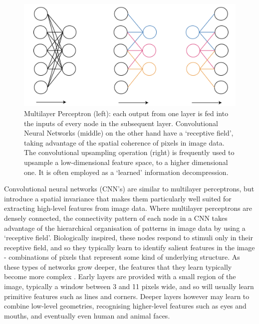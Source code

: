 \begin{figure}[tbp]
    \centering
    \includegraphics[width=5in]{images/cnnvsmlp.png}
    
    \caption{Multilayer Perceptron (left): each output from one layer is fed into the inputs of every node in the subsequent layer. Convolutional Neural Networks (middle) on the other hand have a `receptive field', taking advantage of the spatial coherence of pixels in image data. The convolutional upsampling operation (right) is frequently used to upsample a low-dimensional feature space, to a higher dimensional one. It is often employed as a `learned' information decompression.}
    
    \label{convexhull}
\end{figure}


Convolutional neural networks (CNN's) are similar to multilayer perceptrons, but introduce a spatial invariance that makes them particularly well suited for extracting high-level features from image data. Where multilayer perceptrons are densely connected, the connectivity pattern of each node in a CNN takes advantage of the hierarchical organisation of patterns in image data by using a `receptive field'. Biologically inspired, these nodes respond to stimuli only in their receptive field, and so they typically learn to identify salient features in the image - combinations of pixels that represent some kind of underlying structure. As these types of networks grow deeper, the features that they learn typically become more complex \cite{lecun1989cnn}. Early layers are provided with a small region of the image, typically a window between 3 and 11 pixels wide, and so will usually learn primitive features such as lines and corners. Deeper layers however may learn to combine low-level geometries, recognising higher-level features such as eyes and mouths, and eventually even human and animal faces.


